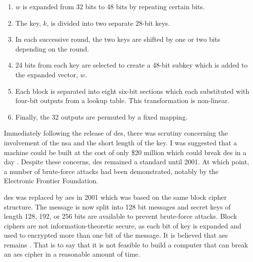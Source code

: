 \begin{algorithm}
\label{alg:des}
\begin{enumerate}
	\item $w$ is expanded from 32 bits to 48 bits by repeating certain bits.
	\item The key, $k$, is divided into two separate 28-bit keys. 
	\item In each successive round, the two keys are shifted by one or two bits depending on the round.
	\item 24 bits from each key are selected to create a 48-bit subkey which is added to the expanded vector, $w$. 
	\item Each block is separated into eight six-bit sections which each substituted with four-bit outputs from a lookup table. This transformation is non-linear.
	\item Finally, the 32 outputs are permuted by a fixed mapping.
\end{enumerate}
\end{algorithm}

Immediately following the release of \ac{des}, there was scrutiny concerning the involvement of the \ac{nsa} and the short length of the key. I was suggested that a machine could be built at the cost of only \$20 million which could break \ac{des} in a day \cite{Diffie1977}. Despite these concerns, \ac{des} remained a standard until 2001. At which point, a number of brute-force attacks had been demonstrated, notably by the Electronic Frontier Foundation. 

\Ac{des} was replaced by \ac{aes} in 2001 \cite{aes2001} which was based on the same block cipher structure. The message is now split into 128 bit messages and secret keys of length 128, 192, or 256 bits are available to prevent brute-force attacks. Block ciphers are not information-theoretic secure, as each bit of key is expanded and used to encrypted more than one bit of the message. It is believed that \ac{aes} remains . That is to say that it is not feasible to build a computer that can break an \ac{aes} cipher in a reasonable amount of time. 



